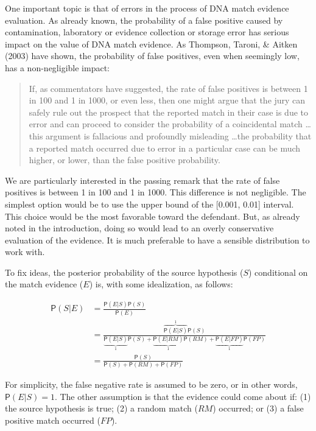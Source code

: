 \documentclass[
  10pt,
  dvipsnames,enabledeprecatedfontcommands]{scrartcl}
\newcommand{\pr}[1]{\mathsf{P}(#1)}
\begin{document}
One important topic is that of errors in the process of DNA match
evidence evaluation. As already known, the probability of a false
positive caused by contamination, laboratory or evidence collection or
storage error has serious impact on the value of DNA match evidence. As
Thompson, Taroni, \& Aitken (2003) have shown, the probability of false
positives, even when seemingly low, has a non-negligible impact:

\begin{quote}
If, as commentators have suggested, the rate of false positives is between 1 in 100 and 1 in 1000, or even less, then one might argue that the jury can safely rule out
the prospect that the reported match in their case is due to error and can proceed to consider the probability of a coincidental match \dots this argument is fallacious and profoundly misleading \dots  the probability that a reported match occurred due to error in a particular case can be much higher, or lower, than the false positive probability. 
\end{quote}

\noindent We are particularly interested in the passing remark that the
rate of false positives is between 1 in 100 and 1 in 1000. This
difference is not negligible. The simplest option would be to use the
upper bound of the {[}0.001, 0.01{]} interval. This choice would be the
most favorable toward the defendant. But, as already noted in the
introduction, doing so would lead to an overly conservative evaluation
of the evidence. It is much preferable to have a sensible distribution
to work with.

To fix ideas, the posterior probability of the source hypothesis (\(S\))
conditional on the match evidence (\(E\)) is, with some idealization, as
follows:

\begin{align*}
\pr{S \vert E} &   =  \frac{\pr{E\vert S} \pr{S} } {\pr{E}}\\
& = \frac{\overbrace{\pr{E\vert S}}^1 \pr{S}}{\underbrace{\pr{E\vert S}}_1 \pr{S} + \underbrace{\pr{E \vert RM}}_1 \pr{RM} + \underbrace{\pr{E \vert FP}}_1 \pr{FP}} \\ & = \frac{\pr{S}}{\pr{S} + \pr{RM} + \pr{FP}} 
\end{align*}

\noindent For simplicity, the false negative rate is assumed to be zero,
or in other words, \(\pr{E\vert S} =1\). The other assumption is that
the evidence could come about if: (1) the source hypothesis is true; (2)
a random match (\(RM\)) occurred; or (3) a false positive match occurred
(\(FP\)).
\end{document}
